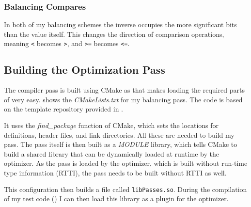 \subsubsection{Balancing Compares}
In both of my balancing schemes the inverse occupies the more significant bits than the value itself.
This changes the direction of comparison operations, meaning \texttt{<} becomes \texttt{>}, and \texttt{>=} becomes \texttt{<=}.

\subsection{Building the Optimization Pass}
\label{buildpass}
The compiler pass is built using CMake as that makes loading the required parts of \llvm{} very easy.
 shows the \emph{CMakeLists.txt} for my balancing pass.
The code is based on the template repository provided in \cite{sampson2015llvm}.



It uses the \emph{find\_package} function of CMake, which sets the locations for definitions, header files, and link directories.
All these are needed to build my pass.
The pass itself is then built as a \emph{MODULE} library, which tells CMake to build a shared library that can be dynamically loaded at runtime by the optimizer.
As the pass is loaded by the optimizer, which is built without run-time type information (RTTI), the pass needs to be built without RTTI as well.

This configuration then builds a file called \texttt{libPasses.so}.
During the compilation of my test code () I can then load this library as a plugin for the \llvm{} optimizer.
